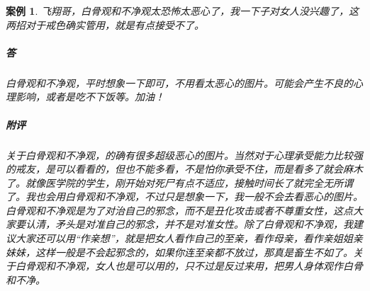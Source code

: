 \documentclass{ctexart}
\newtheorem{case}{案例}
\begin{document}
\begin{case}
    飞翔哥，白骨观和不净观太恐怖太恶心了，我一下子对女人没兴趣了，这两招对于戒色确实管用，就是有点接受不了。
    \subparagraph{答} 白骨观和不净观，平时想象一下即可，不用看太恶心的图片。可能会产生不良的心理影响，或者是吃不下饭等。加油！
    \subparagraph{附评} 关于白骨观和不净观，的确有很多超级恶心的图片。当然对于心理承受能力比较强的戒友，是可以看看的，但也不能多看，不是怕你承受不住，而是看多了就会麻木了。就像医学院的学生，刚开始对死尸有点不适应，接触时间长了就完全无所谓了。我也会用白骨观和不净观，不过只是想象一下，我一般不会去看恶心的图片。白骨观和不净观是为了对治自己的邪念，而不是丑化攻击或者不尊重女性，这点大家要认清，矛头是对准自己的邪念，并不是对准女性。除了白骨观和不净观，我建议大家还可以用“作亲想”，就是把女人看作自己的至亲，看作母亲，看作亲姐姐亲妹妹，这样一般是不会起邪念的，如果你连至亲都不放过，那真是畜生不如了。关于白骨观和不净观，女人也是可以用的，只不过是反过来用，把男人身体观作白骨和不净。
\end{case}
\end{document}
